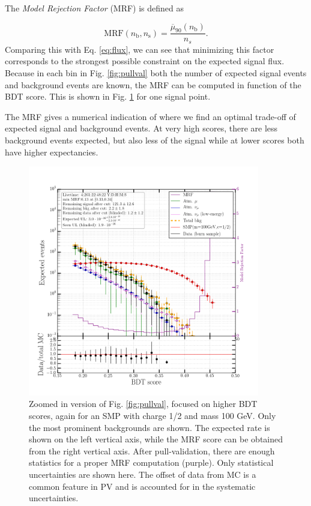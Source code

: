\noindent The \textit{Model Rejection Factor} (MRF) is defined as 

\begin{equation}
\textrm{MRF}\left(n_\textrm{b}, n_\textrm{s}\right) =  \frac{\overline{\mu}_{90}\left(n_\textrm{b}\right)}{n_s}.
\end{equation}
\noindent Comparing this with Eq. \ref{eq:flux}, we can see that minimizing this factor corresponds to the strongest possible constraint on the expected signal flux. Because in each bin in Fig. \ref{fig:pullval} both the number of expected signal events and background events are known, the MRF can be computed in function of the BDT score. This is shown in Fig. \ref{fig:mrf} for one signal point.

The MRF gives a numerical indication of where we find an optimal trade-off of expected signal and background events. At very high scores, there are less background events expected, but also less of the signal while at lower scores both have higher expectancies.\\

\begin{figure}
\centering
\includegraphics[width=0.9\textwidth]{chapter8/img/ModelRejectionFactor_percentile_0p9_signal_m_100_ch_1ovr2_noSYST.png}
\caption{Zoomed in version of Fig. \ref{fig:pullval}, focused on higher BDT scores, again for an SMP with charge 1/2 and mass 100 GeV. Only the most prominent backgrounds are shown. The expected rate is shown on the left vertical axis, while the MRF score can be obtained from the right vertical axis. After pull-validation, there are enough statistics for a proper MRF computation (purple). Only statistical uncertainties are shown here. The offset of data from MC is a common feature in PV and is accounted for in the systematic uncertainties.}
\label{fig:mrf}
\end{figure}

